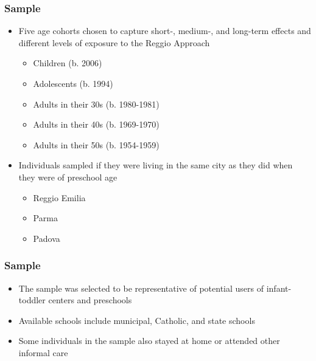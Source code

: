 \documentclass[dynamic]{JJH-Beamer}
\begin{document}

\begin{frame}
\frametitle{Sample}
\begin{itemize}
	\item Five age cohorts chosen to capture short-, medium-, and long-term effects and different levels of exposure to the Reggio Approach
	\begin{itemize}
		\item Children (b. 2006)
		\item Adolescents (b. 1994)
		\item Adults in their 30s (b. 1980-1981)
		\item Adults in their 40s (b. 1969-1970)
		\item Adults in their 50s (b. 1954-1959)
	\end{itemize}
	\item Individuals sampled if they were living in the same city as they did when they were of preschool age
		\begin{itemize}
			\item Reggio Emilia
			\item Parma
			\item Padova
		\end{itemize}
\end{itemize}
\end{frame}

\begin{frame}
\frametitle{Sample}
\begin{itemize}
	\item The sample was selected to be representative of potential users of infant-toddler centers and preschools
	\item Available schools include municipal, Catholic, and state schools
	\item Some individuals in the sample also stayed at home or attended other informal care
\end{itemize}
\end{frame}

\end{document}
